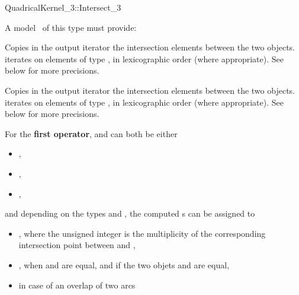 \begin{ccRefFunctionObjectConcept}{QuadricalKernel_3::Intersect_3}

\ccRefines



A model \ccVar\ of this type must provide:

{Copies in the output iterator the intersection elements between the
two objects.  iterates on
elements of type , in lexicographic order
(where appropriate). See below for more precisions.}

{Copies in the output iterator the intersection elements between the
two objects.  iterates on
elements of type , in lexicographic order 
(where appropriate). See below for more precisions.}

For the \textbf{first operator},  and  can both 
be either

\begin{itemize}
\item {} ,
\item {} ,
\item {} ,
\end{itemize} 

and depending on the types  and , the computed 
s can be assigned to 
\begin{itemize}
\item {} ,
where the unsigned integer is the multiplicity of the corresponding
intersection point between  and ,
\item {} , when  and  are equal, and 
if the two objets  and  are equal,
\item {}  in case of an overlap of 
two arcs
\end{itemize} 


\end{ccRefFunctionObjectConcept}
